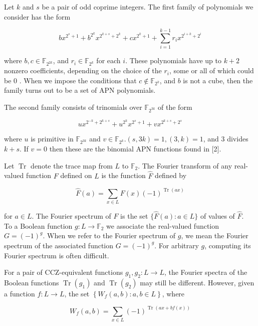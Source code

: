 \documentclass[10pt]{article}
\begin{document}
Let $k$ and $s$ be a pair of odd coprime integers. The first family of polynomials we consider has the form


\begin{equation*}
b x^{2^{s}+1}+b^{2^{k}} x^{2^{k+s}+2^{k}}+c x^{2^{k}+1}+\sum_{i=1}^{k-1} r_{i} x^{2^{i+k}+2^{i}} \tag{1}
\end{equation*}


where $b, c \in \mathbb{F}_{2^{2 k}}$, and $r_{i} \in \mathbb{F}_{2^{k}}$ for each $i$. These polynomials have up to $k+2$ nonzero coefficients, depending on the choice of the $r_{i}$, some or all of which could be 0 . When we impose the conditions that $c \notin \mathbb{F}_{2^{k}}$, and $b$ is not a cube, then the family turns out to be a set of APN polynomials.

The second family consists of trinomials over $\mathbb{F}_{2^{3 k}}$ of the form


\begin{equation*}
u x^{2^{-k}+2^{k+s}}+u^{2^{k}} x^{2^{s}+1}+v x^{2^{k+s}+2^{s}} \tag{2}
\end{equation*}


where $u$ is primitive in $\mathbb{F}_{2^{3 k}}$ and $v \in \mathbb{F}_{2^{k}} .(s, 3 k)=1,(3, k)=1$, and 3 divides $k+s$. If $v=0$ then these are the binomial APN functions found in [2].

Let $\operatorname{Tr}$ denote the trace map from $L$ to $\mathbb{F}_{2}$. The Fourier transform of any real-valued function $F$ defined on $L$ is the function $\widehat{F}$ defined by

$$
\widehat{F}(a)=\sum_{x \in L} F(x)(-1)^{\operatorname{Tr}(a x)}
$$

for $a \in L$. The Fourier spectrum of $F$ is the set $\{\widehat{F}(a): a \in L\}$ of values of $\widehat{F}$.\\
To a Boolean function $g: L \rightarrow \mathbb{F}_{2}$ we associate the real-valued function $G=(-1)^{g}$. When we refer to the Fourier spectrum of $g$, we mean the Fourier spectrum of the associated function $G=(-1)^{g}$. For arbitrary $g$, computing its Fourier spectrum is often difficult.

For a pair of CCZ-equivalent functions $g_{1}, g_{2}: L \rightarrow L$, the Fourier spectra of the Boolean functions $\operatorname{Tr}\left(g_{1}\right)$ and $\operatorname{Tr}\left(g_{2}\right)$ may still be different. However, given a function $f: L \rightarrow L$, the set $\left\{W_{f}(a, b): a, b \in L\right\}$, where

$$
W_{f}(a, b)=\sum_{x \in L}(-1)^{\operatorname{Tr}(a x+b f(x))}
$$
\end{document}
